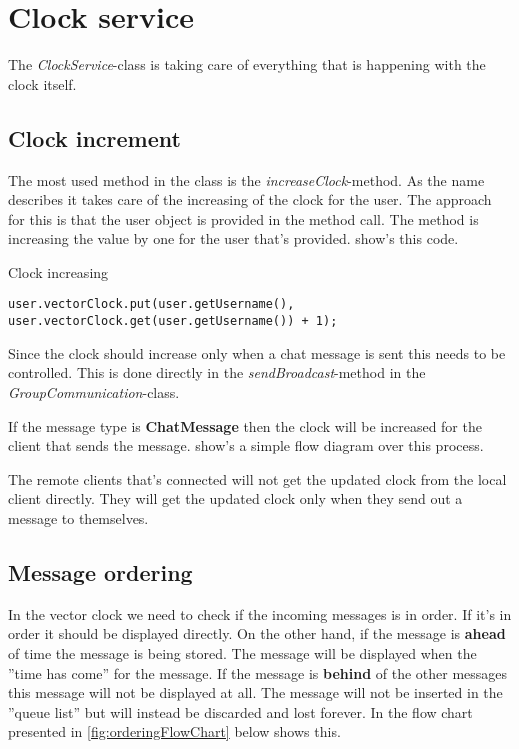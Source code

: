 \section{Clock service}
The \textit{ClockService}-class is taking care of everything that is happening with the clock itself.

\subsection{Clock increment}
The most used method in the class is the \textit{increaseClock}-method. As the name describes it takes care of the increasing of the clock for the user. The approach for this is that the user object is provided in the method call. The  method is increasing the value by one for the user that's provided.  show's this code.

\begin{listing}
\caption{Clock increasing}
\label{code:vecClockInc}
\begin{verbatim}
user.vectorClock.put(user.getUsername(), user.vectorClock.get(user.getUsername()) + 1);
\end{verbatim}
\end{listing}

\bigskip

Since the clock should increase only when a chat message is sent this needs to be controlled. This is done directly in the \textit{sendBroadcast}-method in the \textit{GroupCommunication}-class.

If the message type is \textbf{ChatMessage} then the clock will be increased for the client that sends the message.  show's a simple flow diagram over this process.


\bigskip

The remote clients that's connected will not get the updated clock from the local client directly. They will get the updated clock only when they send out a message to themselves.

\subsection{Message ordering}
In the vector clock we need to check if the incoming messages is in order. If it's in order it should be displayed directly. On the other hand, if the message is \textbf{ahead} of time the message is being stored. The message will be displayed when the ''time has come'' for the message. If the message is \textbf{behind} of the other messages this message will not be displayed at all. The message will not be inserted in the ''queue list'' but will instead be discarded and lost forever. In the flow chart presented in \cref{fig:orderingFlowChart} below shows this.


